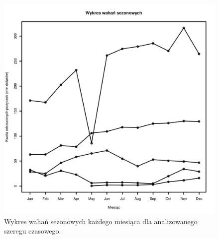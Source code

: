 \documentclass[11pt]{article}
\begin{document}
\begin{figure}[h]

    \centering
	\includegraphics[width=\textwidth]{images/data_monthly_train_sezonowy_ogolny.png}
    \caption{Wykres wahań sezonowych każdego miesiąca dla analizowanego szeregu czasowego.}
    \label{fig:data_monthly_train_sezonowy_ogolny}

\end{figure}

\newpage
\end{document}
